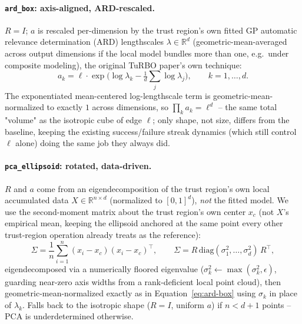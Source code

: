 \documentclass[11pt]{article}
\begin{document}
\paragraph{\texttt{ard\_box}: axis-aligned, ARD-rescaled.} $R = I$;
$a$ is rescaled per-dimension by the trust region's own fitted GP
automatic relevance determination (ARD) lengthscales $\lambda \in
\mathbb{R}^d$ (geometric-mean-averaged across output dimensions if the
local model bundles more than one, e.g.\ under composite modeling), the
original TuRBO paper's own technique:
\begin{equation}
  a_k = \ell \cdot \exp\!\Big(\log \lambda_k - \tfrac{1}{d}\textstyle\sum_j \log \lambda_j\Big),
  \qquad k = 1, \dots, d.
  \label{eq:ard-box}
\end{equation}
The exponentiated mean-centered log-lengthscale term is geometric-mean-
normalized to exactly $1$ across dimensions, so $\prod_k a_k = \ell^d$ --
the same total "volume" as the isotropic cube of edge $\ell$; only shape,
not size, differs from the baseline, keeping the existing success/failure
streak dynamics (which still control $\ell$ alone) doing the same job they
always did.

\paragraph{\texttt{pca\_ellipsoid}: rotated, data-driven.} $R$ and $a$ come
from an eigendecomposition of the trust region's own local accumulated
data $X \in \mathbb{R}^{n \times d}$ (normalized to $[0,1]^d$), \emph{not}
the fitted model. We use the second-moment matrix about the trust region's
own center $x_c$ (not $X$'s empirical mean, keeping the ellipsoid anchored
at the same point every other trust-region operation already treats as the
reference):
\begin{equation}
  \Sigma = \frac{1}{n}\sum_{i=1}^n (x_i - x_c)(x_i - x_c)^\top,
  \qquad \Sigma = R\,\mathrm{diag}(\sigma_1^2, \dots, \sigma_d^2)\,R^\top,
\end{equation}
eigendecomposed via a numerically floored eigenvalue ($\sigma_k^2
\leftarrow \max(\sigma_k^2, \epsilon)$, guarding near-zero axis widths from
a rank-deficient local point cloud), then geometric-mean-normalized exactly
as in Equation~\ref{eq:ard-box} using $\sigma_k$ in place of $\lambda_k$.
Falls back to the isotropic shape ($R = I$, uniform $a$) if $n < d+1$
points -- PCA is underdetermined otherwise.
\end{document}
